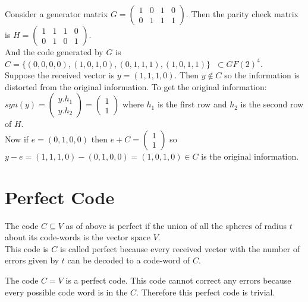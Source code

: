 \begin{example}
    Consider a generator matrix \(G=\begin{pmatrix}
        1 & 0 & 1 & 0\\
        0 & 1 & 1 & 1
    \end{pmatrix}\). Then the parity check matrix is \(H=\begin{pmatrix}
        1 & 1 & 1 & 0\\
        0 & 1 & 0 & 1
    \end{pmatrix}\). \\
    
And the code generated by \(G\) is  \(C=\{(0,0,0,0),(1,0,1,0),(0,1,1,1),(1,0,1,1)\} \;\; \subset GF(2)^{4}\).\\
    
Suppose the received vector is \(y=(1,1,1,0)\). Then \(y \not \in C\) so the information is distorted from the original information. To get the original information:\\
\(syn(y)= \begin{pmatrix}
    y.h_1 \\ y.h_2
\end{pmatrix} = \begin{pmatrix}
    1 \\ 1
\end{pmatrix}\) where \(h_1\) is the first row and \(h_2\) is the second row of \(H\).\\
Now if \(e=(0,1,0,0)\) then \(e+C=\begin{pmatrix}
    1 \\ 1
\end{pmatrix}\) so \(y-e=(1,1,1,0)-(0,1,0,0)=(1,0,1,0) \in C\) is the original information.

\end{example}


\section{Perfect Code}
    The code \(C \subseteq V\) as of above is perfect if the union of all the spheres of radius \(t\) about its code-words is the vector space \(V\).\\
    This code is \(C\) is called perfect because every received vector with the number of errors given by \(t\) can be decoded to a code-word of \(C\).

\begin{example}
    The code \(C=V\) is a perfect code. This code cannot correct any errors because every possible code word is in the \(C\). Therefore this perfect code is trivial.
\end{example} 

